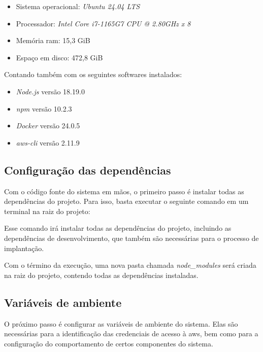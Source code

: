 \begin{itemize}
    \item Sistema operacional: \textit{Ubuntu 24.04 LTS}
    \item Processador: \textit{Intel Core i7-1165G7 CPU @ 2.80GHz x 8}
    \item Memória \gls{ram}: 15,3 GiB 
    \item Espaço em disco: 472,8 GiB
\end{itemize}

Contando também com os seguintes softwares instalados:

\begin{itemize}
    \item \textit{Node.js} versão 18.19.0
    \item \textit{npm} versão 10.2.3
    \item \textit{Docker} versão 24.0.5
    \item \textit{aws-cli} versão 2.11.9
\end{itemize}

\subsection{Configuração das dependências}
\label{subsec:configuracaoDasDependencias}

Com o código fonte do sistema em mãos, o primeiro passo é instalar todas as dependências do projeto. Para isso, basta executar o seguinte comando em um terminal na raiz do projeto:


Esse comando irá instalar todas as dependências do projeto, incluindo as dependências de desenvolvimento, que também são necessárias para o processo de implantação.

Com o término da execução, uma nova pasta chamada \textit{node\_modules} será criada na raiz do projeto, contendo todas as dependências instaladas.

\subsection{Variáveis de ambiente}
\label{subsec:variaveisDeAmbienteEFeatureFlags}

O próximo passo é configurar as variáveis de ambiente do sistema. Elas são necessárias para a identificação das credenciais de acesso à \gls{aws}, bem como para a configuração do comportamento de certos componentes do sistema.

